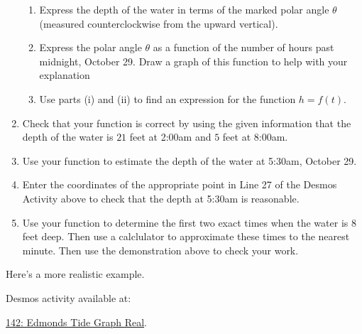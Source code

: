 \documentclass{ximera}
\begin{document}
\begin{example}
\begin{explanation}
\begin{enumerate}
\begin{enumerate}
\item Express the depth of the water in terms of the marked polar angle $\theta$ (measured counterclockwise from the upward vertical).

\item Express the polar angle $\theta$ as a function of the number of hours past midnight, October 29. Draw a graph of this function to help with your explanation

\item Use parts (i) and (ii) to find an expression for the function $h=f(t)$.
\end{enumerate}


\item Check that your function is correct by using the given information that the depth of the water is $21$ feet at 2:00am and $5$ feet at 8:00am.


\item Use your function to estimate the depth of the water at 5:30am, October 29.

\item Enter the coordinates of the appropriate point in Line 27 of the Desmos Activity above to check that the depth at 5:30am is reasonable.

\item Use your function to determine the first two exact times when the water is $8$ feet deep. Then use a calclulator to approximate these times to the nearest minute. Then use the demonstration above to check your work.

\end{enumerate}

\end{explanation}

\end{example}


\begin{example} \label{EXPODFefeRE}
Here's a more realistic example.

Desmos activity available at:

\href{https://www.desmos.com/calculator/pcsl4wgacj}{142: Edmonds Tide Graph Real}.

 
\begin{onlineOnly}
    \begin{center}
\end{center}
\end{onlineOnly}



\end{example}
\end{document}
